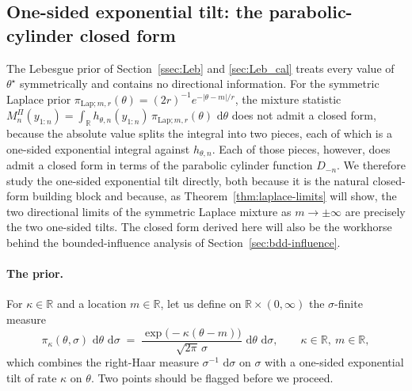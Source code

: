 \documentclass{article}%
\newcommand{\dd}{\,\mathrm{d}}
\newcommand{\1}{\mathbf{1}}
\begin{document}
\subsection{One-sided exponential tilt: the parabolic-cylinder closed form}
\label{sec:exptilt}

The Lebesgue prior of Section~\ref{ssec:Leb} and \ref{sec:Leb_cal} treats every value of $\theta^\star$ symmetrically and contains no directional information. For the symmetric Laplace prior $\pi_{\mathrm{Lap};m,r}(\theta) =(2r)^{-1}e^{-|\theta-m|/r}$, the mixture statistic $M_n^{\Pi}(y_{1:n})=\int_\mathbb{R} h_{\theta,n}(y_{1:n})\,\pi_{\mathrm{Lap};m,r}(\theta)\,\dd\theta$
does not admit a closed form, because the absolute value splits the integral into two pieces, each of which is a one-sided exponential integral against $h_{\theta,n}$. Each of those pieces, however, does admit a closed form in terms of the parabolic cylinder
function $D_{-n}$. We therefore study the one-sided exponential tilt directly, both because it is the natural closed-form building block and because, as Theorem~\ref{thm:laplace-limits} will show, the two
directional limits of the symmetric Laplace mixture as $m\to\pm\infty$ are precisely the two one-sided tilts. The closed form derived here will also be the workhorse behind the bounded-influence analysis of
Section~\ref{sec:bdd-influence}.


\paragraph{The prior.} For $\kappa\in\mathbb{R}$ and a location $m\in\mathbb{R}$, let us define on $\mathbb{R}\times(0,\infty)$ the $\sigma$-finite measure
\begin{equation}\label{eq:exp-tilt-prior}
  \pi_\kappa(\theta,\sigma)\,\dd\theta\,\dd\sigma
  \;=\;\frac{\exp\!\bigl(-\kappa(\theta-m)\bigr)}{\sqrt{2\pi}\,\sigma}\,
  \dd\theta\,\dd\sigma,
  \qquad \kappa\in\mathbb{R},\ m\in\mathbb{R},
\end{equation}
which combines the right-Haar measure $\sigma^{-1}\,\dd\sigma$ on $\sigma$
with a one-sided exponential tilt of rate $\kappa$ on $\theta$. Two points should be flagged before we proceed.
\end{document}
